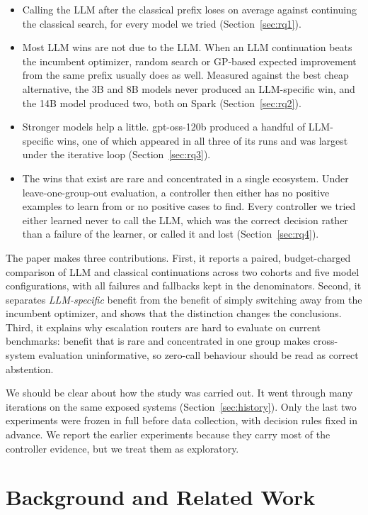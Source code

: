 \begin{itemize}
  \item Calling the LLM after the classical prefix loses on average against continuing the classical search, for every model we tried (Section~\ref{sec:rq1}).
  \item Most LLM wins are not due to the LLM. When an LLM continuation beats the incumbent optimizer, random search or GP-based expected improvement from the same prefix usually does as well. Measured against the best cheap alternative, the 3B and 8B models never produced an LLM-specific win, and the 14B model produced two, both on Spark (Section~\ref{sec:rq2}).
  \item Stronger models help a little. gpt-oss-120b produced a handful of LLM-specific wins, one of which appeared in all three of its runs and was largest under the iterative loop (Section~\ref{sec:rq3}).
  \item The wins that exist are rare and concentrated in a single ecosystem. Under leave-one-group-out evaluation, a controller then either has no positive examples to learn from or no positive cases to find. Every controller we tried either learned never to call the LLM, which was the correct decision rather than a failure of the learner, or called it and lost (Section~\ref{sec:rq4}).
\end{itemize}

The paper makes three contributions. First, it reports a paired, budget-charged comparison of LLM and classical continuations across two cohorts and five model configurations, with all failures and fallbacks kept in the denominators. Second, it separates \emph{LLM-specific} benefit from the benefit of simply switching away from the incumbent optimizer, and shows that the distinction changes the conclusions. Third, it explains why escalation routers are hard to evaluate on current benchmarks: benefit that is rare and concentrated in one group makes cross-system evaluation uninformative, so zero-call behaviour should be read as correct abstention.

We should be clear about how the study was carried out. It went through many iterations on the same exposed systems (Section~\ref{sec:history}). Only the last two experiments were frozen in full before data collection, with decision rules fixed in advance. We report the earlier experiments because they carry most of the controller evidence, but we treat them as exploratory.

\section{Background and Related Work}

